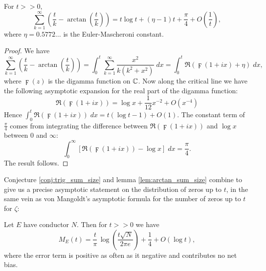 \begin{lemma}\label{lem:arctan_sum_size}
For $t >> 0$, 
\begin{equation}
\sum_{k=1}^{\infty} \left(\frac{t}{k} - \arctan\left(\frac{t}{k}\right)\right) = t\log t + (\eta-1)t + \frac{\pi}{4} + O\left(\frac{1}{t}\right),
\end{equation}
where $\eta = 0.5772\ldots$ is the Euler-Mascheroni constant.
\end{lemma}
\begin{proof}
We have
\begin{equation*}
\sum_{k=1}^{\infty} \left(\frac{t}{k} - \arctan\left(\frac{t}{k}\right)\right) = \int_{0}^{t} \sum_{k=1}^{\infty} \frac{x^2}{k(k^2+x^2)} \; dx = \int_{0}^{t} \Re\left(\digamma(1+ix) + \eta\right) \; dx,
\end{equation*}
where $\digamma(z)$ is the digamma function on $\mathbb{C}$. Now along the critical line we have the following asymptotic expansion for the real part of the digamma function:
\begin{equation}
\Re\left(\digamma(1+ix)\right) = \log x + \frac{1}{12} x^{-2} + O(x^{-4})
\end{equation}
Hence $\int_{0}^{t} \Re\left(\digamma(1+ix)\right) \; dx = t(\log t - 1)  + O(1)$. The constant term of $\frac{\pi}{4}$ comes from integrating the difference between $\Re\left(\digamma(1+ix)\right)$ and $\log x$ between $0$ and $\infty$:
\begin{equation*}
\int_{0}^{\infty} \left[\Re\left(\digamma(1+ix)\right) - \log x\right] \; dx = \frac{\pi}{4}.
\end{equation*}
The result follows.
\end{proof}

Conjecture \ref{conj:trig_sum_size} and lemma \ref{lem:arctan_sum_size} combine to give us a precise asymptotic statement on the distribution of zeros up to $t$, in the same vein as von Mangoldt's asymptotic formula for the number of zeros up to $t$ for $\zeta$:

\begin{theorem}[S.]\label{thm:zero_density}
Let $E$ have conductor $N$. Then for $t>>0$ we have
\begin{equation}\label{eqn:zero_density}
M_E(t) = \frac{t}{\pi} \, \log\left(\frac{t\sqrt{N}}{2\pi e}\right) + \frac{1}{4} + O(\log t),
\end{equation}
where the error term is positive as often as it negative and contributes no net bias.
\end{theorem}

